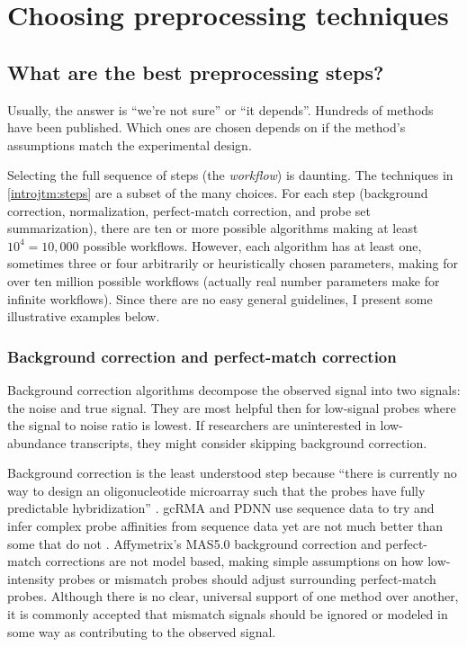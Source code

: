 \section{Choosing preprocessing techniques}

\subsection{What are the best preprocessing steps?}\label{introjtm:whatsbest}

Usually, the answer is ``we're not sure'' or ``it depends''. 
Hundreds of methods have been published.
Which ones are chosen depends on if the method's assumptions match
the experimental design.

Selecting the full sequence of steps (the \textit{workflow}) is daunting.
The techniques in \ref{introjtm:steps} are a subset of the many choices.
For each step (background correction, normalization,
perfect-match correction, and probe set summarization), there are
ten or more possible algorithms making at least $10^4=10,000$ possible
workflows. However, each algorithm has at least one, sometimes
three or four arbitrarily or heuristically chosen parameters, making
for over ten million possible workflows (actually real number parameters make 
for infinite workflows).
Since there are no easy general guidelines, I present some
illustrative examples below. 

\subsubsection{Background correction and perfect-match correction}

Background correction algorithms decompose the observed
signal into two signals: the noise and true signal.
They are most helpful then for low-signal probes where
the signal to noise ratio is lowest. If researchers are uninterested
in low-abundance transcripts, they might consider skipping
background correction.

Background correction is the least understood step because
``there is currently no way to design 
an oligonucleotide microarray such that the probes have 
fully predictable hybridization'' \cite{Pozhitkov:2007go}.
gcRMA and PDNN use sequence data to try and infer complex
probe affinities from sequence data yet are not much better than
some that do not \cite{Irizarry:2003ge,Zhang:2003to,Wu:2004wh}.
Affymetrix's MAS5.0 background correction and perfect-match corrections
are not model based, making simple assumptions on how low-intensity probes
or mismatch probes should adjust surrounding perfect-match probes.
Although there is no clear, universal support of one method over another,  
it is commonly accepted that 
mismatch signals should be ignored or modeled in some way as 
contributing to the observed signal.

